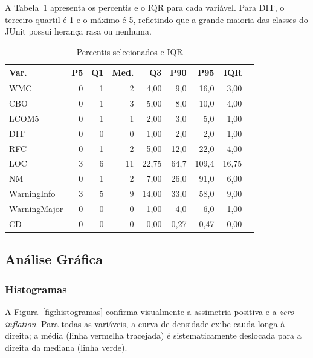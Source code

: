 \documentclass[12pt]{article}
\begin{document}
A Tabela~\ref{tab:percentis} apresenta os percentis e o IQR para cada
variável. Para DIT, o terceiro quartil é 1 e o máximo é 5, refletindo
que a grande maioria das classes do JUnit possui herança rasa ou nenhuma.

\begin{table}[H]
\centering
\caption{Percentis selecionados e IQR}
\label{tab:percentis}
\begin{tabular}{lrrrrrrrr}
\toprule
\textbf{Var.} & \textbf{P5} & \textbf{Q1} & \textbf{Med.} & \textbf{Q3} & \textbf{P90} & \textbf{P95} & \textbf{IQR} \\
\midrule
WMC          & 0    & 1    & 2     & 4,00  & 9,0  & 16,0   & 3,00 \\
CBO          & 0    & 1    & 3     & 5,00  & 8,0  & 10,0   & 4,00 \\
LCOM5        & 0    & 1    & 1     & 2,00  & 3,0  & 5,0    & 1,00 \\
DIT          & 0    & 0    & 0     & 1,00  & 2,0  & 2,0    & 1,00 \\
RFC          & 0    & 1    & 2     & 5,00  & 12,0 & 22,0   & 4,00 \\
LOC          & 3    & 6    & 11    & 22,75 & 64,7 & 109,4  & 16,75\\
NM           & 0    & 1    & 2     & 7,00  & 26,0 & 91,0   & 6,00 \\
WarningInfo  & 3    & 5    & 9     & 14,00 & 33,0 & 58,0   & 9,00 \\
WarningMajor & 0    & 0    & 0     & 1,00  & 4,0  & 6,0    & 1,00 \\
CD           & 0    & 0    & 0     & 0,00  & 0,27 & 0,47   & 0,00 \\
\bottomrule
\end{tabular}
\end{table}

\subsection{Análise Gráfica}
\label{sec:graficos}

\subsubsection{Histogramas}

A Figura~\ref{fig:histogramas} confirma visualmente a assimetria positiva
e a \textit{zero-inflation}. Para todas as variáveis, a curva de densidade
exibe cauda longa à direita; a média (linha vermelha tracejada) é
sistematicamente deslocada para a direita da mediana (linha verde).
\end{document}

